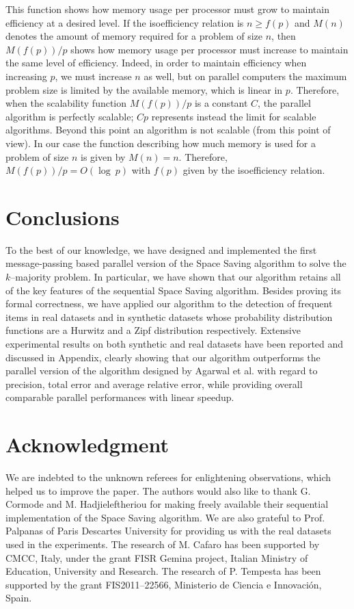 \documentclass[final,3p,times]{elsarticle}
\begin{document}
This function shows how memory usage per processor must grow to maintain efficiency at a desired level. If the isoefficiency relation is $n \geq f(p)$ and $M(n)$ denotes the
amount of memory required for a problem of size $n$, then $M (f (p))/p$ shows how memory usage per processor must increase to maintain the same level of efficiency. Indeed, in
order to maintain efficiency when increasing $p$, we must increase $n$ as well, but on parallel computers the maximum problem size is limited by the available memory, which is
linear in $p$. Therefore, when the scalability function $M (f (p))/p$ is a constant $C$, the parallel algorithm is perfectly scalable; $Cp$ represents instead the limit for
scalable algorithms. Beyond this point an algorithm is not scalable (from this point of view).
In our case the function describing how much memory is used for a problem of size $n$ is given by $M (n) = n$. Therefore, $M (f (p))/p = O(\log~p)$ with $f(p)$ given by the
isoefficiency relation.

\section{Conclusions}
\label{conclusions}


To the best of our knowledge, we have designed and implemented the first message-passing based parallel version of the Space Saving algorithm to solve the $k$--majority problem. In particular, we have shown that our algorithm retains all of the key features of the sequential Space Saving algorithm. Besides proving its formal correctness, we have applied our algorithm to the detection of frequent items in real datasets and in synthetic datasets whose probability distribution functions are a Hurwitz and a Zipf distribution respectively. Extensive experimental results on both synthetic and real datasets have been reported and discussed in Appendix, clearly showing that our algorithm outperforms the parallel version of the algorithm designed by Agarwal et al. with regard to precision, total error and average relative error, while providing overall comparable parallel performances with linear speedup.



\section*{Acknowledgment}
We are indebted to the unknown referees for enlightening observations, which helped us to improve the paper. The authors would also like to thank G. Cormode and M. Hadjieleftheriou for making freely available their sequential implementation of the Space Saving algorithm. We are also grateful to Prof. Palpanas of Paris Descartes University for providing us with the real datasets used in the experiments. The research of M. Cafaro has been supported by CMCC, Italy, under the grant FISR Gemina project, Italian Ministry of Education, University and Research. The research of P. Tempesta has been supported by the grant FIS2011--22566, Ministerio de Ciencia e Innovaci\'on, Spain.
\end{document}
